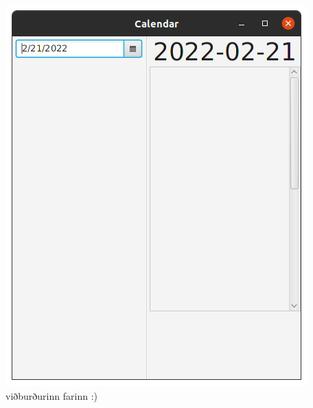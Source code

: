 \documentclass{article}
\begin{document}
\begin{center}
    \includegraphics[scale=0.3]{imgs/s13.png}\\
    viðburðurinn farinn :)
\end{center}
\end{document}
